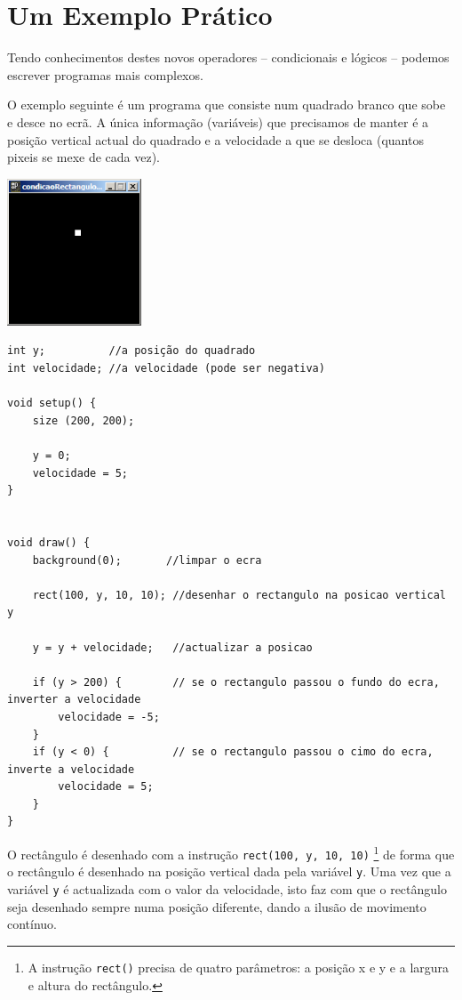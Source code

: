 \section{Um Exemplo Prático}
Tendo conhecimentos destes novos operadores -- condicionais e lógicos -- podemos escrever programas mais complexos.

O exemplo seguinte é um programa que consiste num quadrado branco que sobe e desce no ecrã. A única informação (variáveis) que precisamos de manter é a posição vertical actual do quadrado e a velocidade a que se desloca (quantos pixeis se mexe de cada vez). 
\begin{center}
	\includegraphics[width=4cm]{images/condicaoRectanguloCimaBaixo.eps}
\end{center}
\begin{lstlisting}[caption=Testar a posição vertical de um rectângulo, label=exe:condicaoRectanguloCimaBaixo]
int y;          //a posição do quadrado
int velocidade; //a velocidade (pode ser negativa)

void setup() {
    size (200, 200);
    
    y = 0;
    velocidade = 5;
}


void draw() {
    background(0);       //limpar o ecra
    
    rect(100, y, 10, 10); //desenhar o rectangulo na posicao vertical y
    
    y = y + velocidade;   //actualizar a posicao
        
    if (y > 200) {        // se o rectangulo passou o fundo do ecra, inverter a velocidade
        velocidade = -5;
    }
    if (y < 0) {          // se o rectangulo passou o cimo do ecra, inverte a velocidade
        velocidade = 5;
    }
}
\end{lstlisting}
O rectângulo é desenhado com a instrução \texttt{rect(100, y, 10, 10)}%
\footnote{A instrução \texttt{rect()} precisa de quatro parâmetros: a posição x e y e a largura e altura do rectângulo.}
de forma que o rectângulo é desenhado na posição vertical dada pela variável \texttt{y}.
Uma vez que a variável \texttt{y} é actualizada com o valor da velocidade, isto faz com que o rectângulo seja desenhado sempre numa posição diferente, dando a ilusão de movimento contínuo.

